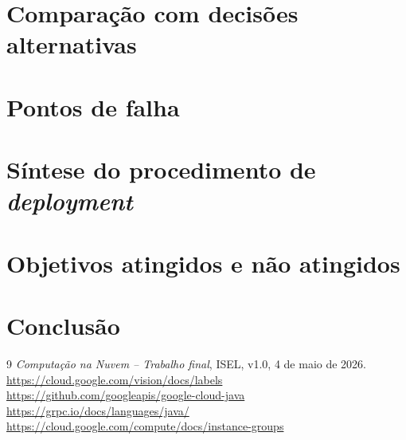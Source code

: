 \documentclass[11pt,a4paper]{article}
\begin{document}
\section{Compara\c{c}\~ao com decis\~oes alternativas}
\label{sec:alternativas}

\section{Pontos de falha}
\label{sec:falhas}

\section{S\'intese do procedimento de \emph{deployment}}
\label{sec:deploy}

\section{Objetivos atingidos e n\~ao atingidos}
\label{sec:resultados}

\section{Conclus\~ao}
\label{sec:conclusao}

\begin{thebibliography}{9}
 \emph{Computa\c{c}\~ao na Nuvem -- Trabalho final}, ISEL, v1.0, 4 de maio de 2026.
    \url{https://cloud.google.com/vision/docs/labels}
 \url{https://github.com/googleapis/google-cloud-java}
      \url{https://grpc.io/docs/languages/java/}
       \url{https://cloud.google.com/compute/docs/instance-groups}
\end{thebibliography}
\end{document}
